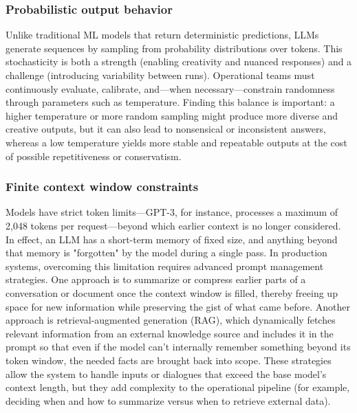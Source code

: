 \subsubsection{Probabilistic output behavior} Unlike traditional ML models that return deterministic predictions, LLMs generate sequences by sampling from probability distributions over tokens. This stochasticity is both a strength (enabling creativity and nuanced responses) and a challenge (introducing variability between runs). Operational teams must continuously evaluate, calibrate, and—when necessary—constrain randomness through parameters such as temperature.
Finding this balance is important: a higher temperature or more random sampling might produce more diverse and creative outputs, but it can also lead to nonsensical or inconsistent answers, whereas a low temperature yields more stable and repeatable outputs at the cost of possible repetitiveness or conservatism.

\subsubsection{Finite context window constraints} Models have strict token limits—GPT-3, for instance, processes a maximum of 2,048 tokens per request—beyond which earlier context is no longer considered. In effect, an LLM has a short-term memory of fixed size, and anything beyond that memory is "forgotten" by the model during a single pass. In production systems, overcoming this limitation requires advanced prompt management strategies. One approach is to summarize or compress earlier parts of a conversation or document once the context window is filled, thereby freeing up space for new information while preserving the gist of what came before. Another approach is retrieval-augmented generation (RAG), which dynamically fetches relevant information from an external knowledge source and includes it in the prompt so that even if the model can't internally remember something beyond its token window, the needed facts are brought back into scope. These strategies allow the system to handle inputs or dialogues that exceed the base model's context length, but they add complexity to the operational pipeline (for example, deciding when and how to summarize versus when to retrieve external data).

